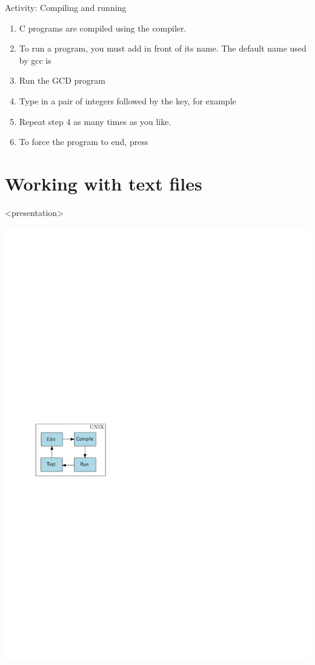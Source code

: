 \begin{frame}{Activity: Compiling and running}
\begin{enumerate}
\item C programs are compiled using the  compiler.
\item To run a program, you must add  in front of its name. The default
name used by gcc is 
\item Run the GCD program
\item Type in a pair of integers followed by the  key, for example
\item Repeat step 4 as many times as you like.  
\item To force the program to end, press 
\end{enumerate}


\end{frame}


\section{Working with text files} %

\begin{frame}<presentation>
\begin{center}
\includegraphics[page=4,width=\textwidth]{flow}
\end{center}
\end{frame}

